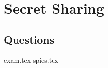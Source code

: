 \documentclass{exam}
\begin{document}
\section{Secret Sharing}
\subsection{Questions}
\begin{questions}
{exam.tex}
{spies.tex}
\end{questions}

\end{document}

